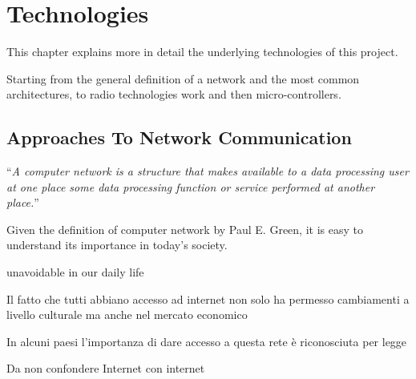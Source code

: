 
\chapter{Technologies}\label{chapter:technologies}


	
	This chapter explains more in detail the underlying technologies of this project.
	
	Starting from the general definition of a network and the most common architectures, to radio technologies work and then micro-controllers.
	

%	
	
	
\section{Approaches To Network Communication}
	
	\begin{center}
		\begin{minipage}[H]{0.9\columnwidth}
			\begin{center}
				``\textit{A computer network is a structure that makes available to a data processing user at one place some data processing function or service performed at another place.}''~\cite{nla.cat-vn252493}
			\end{center}
		\end{minipage}
	\end{center}
	
	
	Given the definition of computer network by Paul E. Green, it is easy to understand its importance in today's society. %
	
	unavoidable in our daily life
	
	Il fatto che tutti abbiano accesso ad internet non solo ha permesso cambiamenti a livello culturale ma anche nel mercato economico
	
	In alcuni paesi l'importanza di dare accesso a questa rete è riconosciuta per legge
	
	Da non confondere Internet con internet
	
